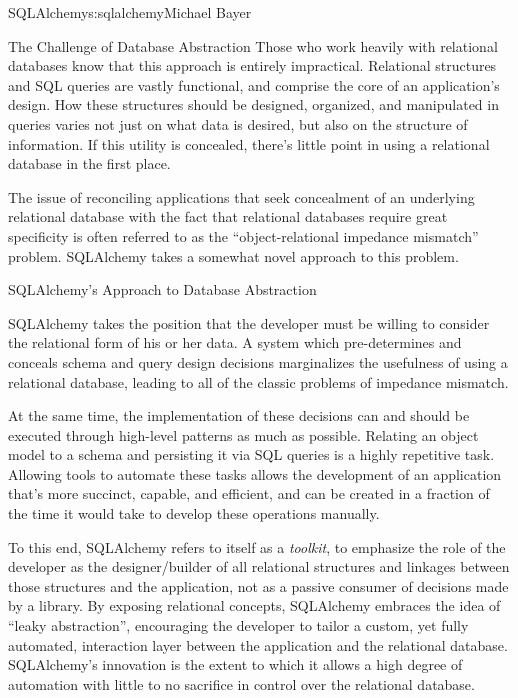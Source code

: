 \begin{aosachapter}{SQLAlchemy}{s:sqlalchemy}{Michael Bayer}
\begin{aosasect1}{The Challenge of Database Abstraction}
Those who work heavily with relational databases know that this approach is
entirely impractical. Relational structures and SQL queries are vastly
functional, and comprise the core of an application's design. How these
structures should be designed, organized, and manipulated in queries varies
not just on what data is desired, but also on the structure of information. If
this utility is concealed, there's little point in using a relational database
in the first place.

The issue of reconciling applications that seek concealment of an underlying
relational database with the fact that relational databases require great
specificity is often referred to as the ``object-relational impedance mismatch''
problem. SQLAlchemy takes a somewhat novel approach to this problem.

\begin{aosasect2}{SQLAlchemy's Approach to Database Abstraction}

SQLAlchemy takes the position that the developer must be willing to consider
the relational form of his or her data. A system which pre-determines and
conceals schema and query design decisions marginalizes the usefulness of
using a relational database, leading to all of the classic problems of impedance
mismatch.

At the same time, the implementation of these decisions can and should be
executed through high-level patterns as much as possible. Relating an object
model to a schema and persisting it via SQL queries is a highly repetitive
task. Allowing tools to automate these tasks allows the development of
an application that's more succinct, capable, and efficient, and can be created
in a fraction of the time it would take to develop these operations manually.

To this end, SQLAlchemy refers to itself as a \emph{toolkit}, to emphasize the role
of the developer as the designer/builder of all relational structures and
linkages between those structures and the application, not as a passive
consumer of decisions made by a library. By exposing relational
concepts, SQLAlchemy embraces the idea of ``leaky abstraction'', encouraging the
developer to tailor a custom, yet fully automated, interaction layer between
the application and the relational database.  SQLAlchemy's innovation is
the extent to which it allows a high degree of automation with little to no
sacrifice in control over the relational database.

\end{aosasect2}


\end{aosasect1}
\end{aosachapter}
